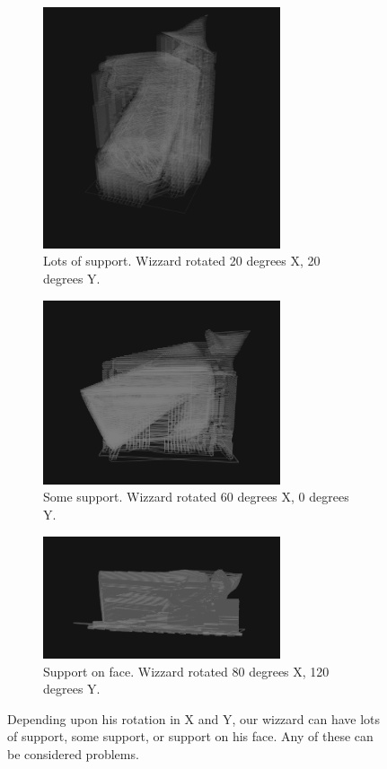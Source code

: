 \documentclass{sigchi}
\begin{document}
\begin{figure}
        \centering
        \begin{subfigure}[b]{0.3\textwidth}
                \includegraphics[width=2.75in]{images/wizzard-lotssupport}
                \caption{Lots of support.  Wizzard rotated 20 degrees X, 20 degrees Y.}
                \label{fig:lots}
        \end{subfigure}
        \begin{subfigure}[b]{0.3\textwidth}
                \includegraphics[width=2.75in]{images/wizzard-somesupport}
                \caption{Some support.  Wizzard rotated 60 degrees X, 0 degrees Y.}
                \label{fig:some}
        \end{subfigure}
        \begin{subfigure}[b]{0.3\textwidth}
                \includegraphics[width=2.75in]{images/wizzard-facesupport}
                \caption{Support on face.  Wizzard rotated 80 degrees X, 120 degrees Y.}
                \label{fig:face}
        \end{subfigure}
        \caption{Depending upon his rotation in X and Y, our wizzard can have lots of support, some support, or support on his face.  Any of these can be considered problems.}\label{fig:rotations}
\end{figure}
\end{document}
